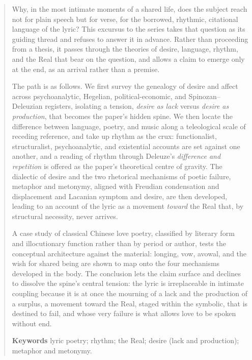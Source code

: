 \documentclass[11pt,a4paper]{article}
\begin{document}
\begin{abstract}
\noindent
Why, in the most intimate moments of a shared life, does the subject reach not for plain speech but for verse, for the borrowed, rhythmic, citational language of the lyric? This excursus to the series takes that question as its guiding thread and refuses to answer it in advance. Rather than proceeding from a thesis, it passes through the theories of desire, language, rhythm, and the Real that bear on the question, and allows a claim to emerge only at the end, as an arrival rather than a premise.

\smallskip
\noindent The path is as follows. We first survey the genealogy of desire and affect across psychoanalytic, Hegelian, political-economic, and Spinozan--Deleuzian registers, isolating a tension, \emph{desire as lack} versus \emph{desire as production}, that becomes the paper's hidden spine. We then locate the difference between language, poetry, and music along a teleological scale of receding reference, and take up rhythm as the crux: functionalist, structuralist, psychoanalytic, and existential accounts are set against one another, and a reading of rhythm through Deleuze's \emph{difference and repetition} is offered as the paper's theoretical centre of gravity. The dialectic of desire and the two rhetorical mechanisms of poetic failure, metaphor and metonymy, aligned with Freudian condensation and displacement and Lacanian symptom and desire, are then developed, leading to an account of the lyric as a movement \emph{toward} the Real that, by structural necessity, never arrives.

\smallskip
\noindent A case study of classical Chinese love poetry, classified by literary form and illocutionary function rather than by period or author, tests the conceptual architecture against the material: longing, vow, avowal, and the wish for shared being are shown to map onto the four mechanisms developed in the body. The conclusion lets the claim surface and declines to dissolve the spine's central tension: the lyric is irreplaceable in intimate coupling because it is at once the mourning of a lack and the production of a surplus, a movement toward the Real, staged within the symbolic, that is destined to fail, and whose very failure is what allows love to be spoken without end.

\vspace{0.6em}
\noindent\textbf{Keywords}\quad
lyric poetry; rhythm; the Real; desire (lack and production); metaphor and metonymy.
\end{abstract}
\end{document}
